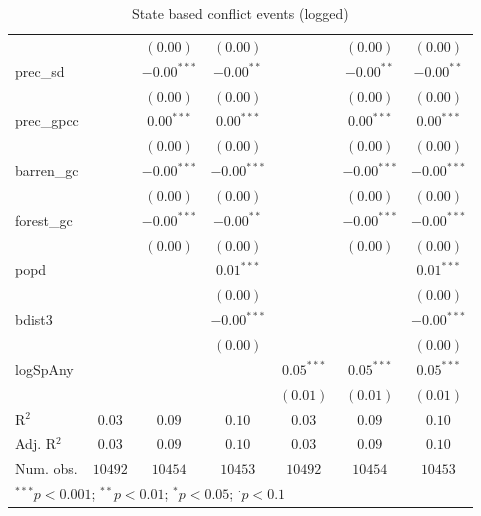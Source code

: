 \begin{sidewaystable}
\begin{center}
{\begin{tabular}{l c c c c c c}
                &               & $(0.00)$      & $(0.00)$      &               & $(0.00)$      & $(0.00)$      \\
prec\_sd        &               & $-0.00^{***}$ & $-0.00^{**}$  &               & $-0.00^{**}$  & $-0.00^{**}$  \\
                &               & $(0.00)$      & $(0.00)$      &               & $(0.00)$      & $(0.00)$      \\
prec\_gpcc      &               & $0.00^{***}$  & $0.00^{***}$  &               & $0.00^{***}$  & $0.00^{***}$  \\
                &               & $(0.00)$      & $(0.00)$      &               & $(0.00)$      & $(0.00)$      \\
barren\_gc      &               & $-0.00^{***}$ & $-0.00^{***}$ &               & $-0.00^{***}$ & $-0.00^{***}$ \\
                &               & $(0.00)$      & $(0.00)$      &               & $(0.00)$      & $(0.00)$      \\
forest\_gc      &               & $-0.00^{***}$ & $-0.00^{**}$  &               & $-0.00^{***}$ & $-0.00^{***}$ \\
                &               & $(0.00)$      & $(0.00)$      &               & $(0.00)$      & $(0.00)$      \\
popd            &               &               & $0.01^{***}$  &               &               & $0.01^{***}$  \\
                &               &               & $(0.00)$      &               &               & $(0.00)$      \\
bdist3          &               &               & $-0.00^{***}$ &               &               & $-0.00^{***}$ \\
                &               &               & $(0.00)$      &               &               & $(0.00)$      \\
logSpAny        &               &               &               & $0.05^{***}$  & $0.05^{***}$  & $0.05^{***}$  \\
                &               &               &               & $(0.01)$      & $(0.01)$      & $(0.01)$      \\
\hline
R$^2$           & $0.03$        & $0.09$        & $0.10$        & $0.03$        & $0.09$        & $0.10$        \\
Adj. R$^2$      & $0.03$        & $0.09$        & $0.10$        & $0.03$        & $0.09$        & $0.10$        \\
Num. obs.       & $10492$       & $10454$       & $10453$       & $10492$       & $10454$       & $10453$       \\
\hline
\multicolumn{7}{l}{\scriptsize{$^{***}p<0.001$; $^{**}p<0.01$; $^{*}p<0.05$; $^{\cdot}p<0.1$}}
\end{tabular}
}
\caption{State based conflict events (logged)}
\label{logState_based}
\end{center}
\end{sidewaystable}
